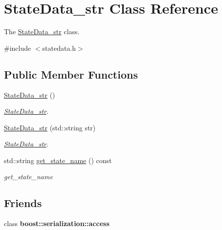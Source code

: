 \hypertarget{class_state_data__str}{}\section{State\+Data\+\_\+str Class Reference}
\label{class_state_data__str}


The \hyperlink{class_state_data__str}{State\+Data\+\_\+str} class.  




{\ttfamily \#include $<$statedata.\+h$>$}

\subsection*{Public Member Functions}
\begin{DoxyCompactItemize}
\item 
\hyperlink{class_state_data__str_a7a4f4ce019e33af56a252e89840ce8c5}{State\+Data\+\_\+str} ()\hypertarget{class_state_data__str_a7a4f4ce019e33af56a252e89840ce8c5}{}\label{class_state_data__str_a7a4f4ce019e33af56a252e89840ce8c5}

\begin{DoxyCompactList}\small\item\em \hyperlink{class_state_data__str}{State\+Data\+\_\+str}. \end{DoxyCompactList}\item 
\hyperlink{class_state_data__str_a471b93b4863500c3fa865b31776917e3}{State\+Data\+\_\+str} (std\+::string str)
\begin{DoxyCompactList}\small\item\em \hyperlink{class_state_data__str}{State\+Data\+\_\+str}. \end{DoxyCompactList}\item 
std\+::string \hyperlink{class_state_data__str_ad3c1ccb2b2e4a6e401fb6896a20b630e}{get\+\_\+state\+\_\+name} () const 
\begin{DoxyCompactList}\small\item\em get\+\_\+state\+\_\+name \end{DoxyCompactList}\end{DoxyCompactItemize}
\subsection*{Friends}
\begin{DoxyCompactItemize}
\item 
class {\bfseries boost\+::serialization\+::access}\hypertarget{class_state_data__str_ac98d07dd8f7b70e16ccb9a01abf56b9c}{}\label{class_state_data__str_ac98d07dd8f7b70e16ccb9a01abf56b9c}

\end{DoxyCompactItemize}


